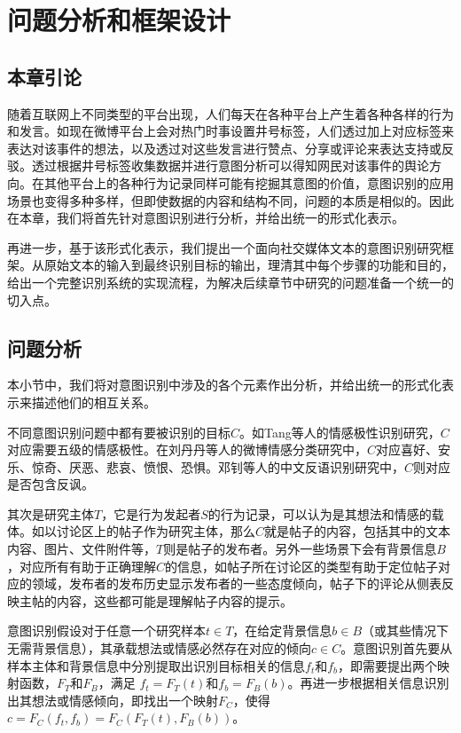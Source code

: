 \chapter{问题分析和框架设计}
\label{cha:problem_framework}

\section{本章引论}

随着互联网上不同类型的平台出现，人们每天在各种平台上产生着各种各样的行为和发言。如现在微博平台上会对热门时事设置井号标签，人们透过加上对应标签来表达对该事件的想法，以及透过对这些发言进行赞点、分享或评论来表达支持或反驳。透过根据井号标签收集数据并进行意图分析可以得知网民对该事件的舆论方向。在其他平台上的各种行为记录同样可能有挖掘其意图的价值，意图识别的应用场景也变得多种多样，但即使数据的内容和结构不同，问题的本质是相似的。因此在本章，我们将首先针对意图识别进行分析，并给出统一的形式化表示。

再进一步，基于该形式化表示，我们提出一个面向社交媒体文本的意图识别研究框架。从原始文本的输入到最终识别目标的输出，理清其中每个步骤的功能和目的，给出一个完整识別系统的实现流程，为解决后续章节中研究的问题准备一个统一的切入点。


\section{问题分析}

本小节中，我们将对意图识别中涉及的各个元素作出分析，并给出统一的形式化表示来描述他们的相互关系。

不同意图识别问题中都有要被识别的目标$C$。如Tang等人\cite{tang2015learning}的情感极性识别研究，$C$对应需要五级的情感极性。在刘丹丹等人\cite{刘丹丹2015基于}的微博情感分类研究中，$C$对应喜好、安乐、惊奇、厌恶、悲哀、愤恨、恐惧。邓钊等人\cite{2015面向微博的中文反语识别研究}的中文反语识别研究中，$C$则对应是否包含反讽。

其次是研究主体$T$，它是行为发起者$S$的行为记录，可以认为是其想法和情感的载体。如以讨论区上的帖子作为研究主体，那么$C$就是帖子的内容，包括其中的文本内容、图片、文件附件等，$T$则是帖子的发布者。另外一些场景下会有背景信息$B$，对应所有有助于正确理解$C$的信息，如帖子所在讨论区的类型有助于定位帖子对应的领域，发布者的发布历史显示发布者的一些态度倾向，帖子下的评论从侧表反映主帖的内容，这些都可能是理解帖子内容的提示。

意图识别假设对于任意一个研究样本$t \in T$，在给定背景信息$b \in B$（或其些情况下无需背景信息），其承载想法或情感必然存在对应的倾向$c \in C$。意图识別首先要从样本主体和背景信息中分別提取出识別目标相关的信息$f_t$和$f_b$，即需要提出两个映射函数，$F_T$和$F_B$，满足 $f_t=F_T(t)$和$f_b=F_B(b)$。再进一步根据相关信息识別出其想法或情感倾向，即找出一个映射$F_C$，使得 $c=F_C(f_t, f_b)=F_C(F_T(t), F_B(b))$。

